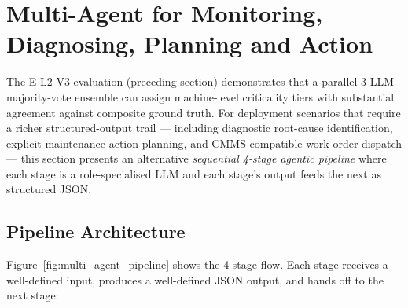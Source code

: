 %

\section{Multi-Agent for Monitoring, Diagnosing, Planning and Action}

The E-L2 V3 evaluation (preceding section) demonstrates that a parallel 3-LLM majority-vote ensemble can assign machine-level criticality tiers with substantial agreement against composite ground truth. For deployment scenarios that require a richer structured-output trail --- including diagnostic root-cause identification, explicit maintenance action planning, and CMMS-compatible work-order dispatch --- this section presents an alternative \emph{sequential 4-stage agentic pipeline} where each stage is a role-specialised LLM and each stage's output feeds the next as structured JSON.

\subsection{Pipeline Architecture}

Figure~\ref{fig:multi_agent_pipeline} shows the 4-stage flow. Each stage receives a well-defined input, produces a well-defined JSON output, and hands off to the next stage:

